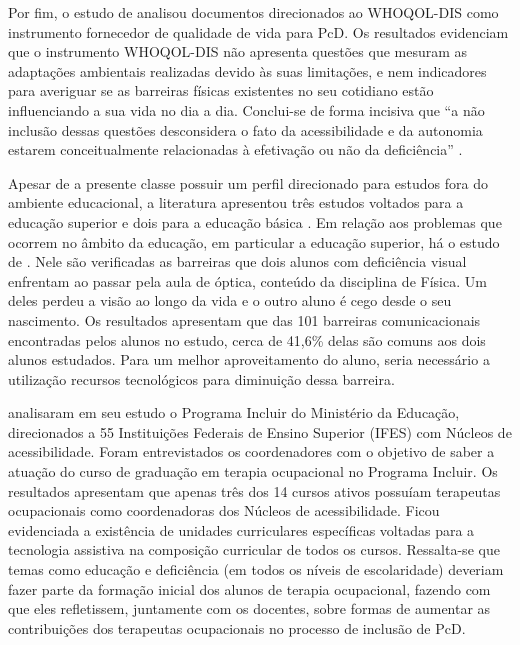 \documentclass{textolivre}
\begin{document}
Por fim, o estudo de \textcite{cantoranietal2015} analisou documentos direcionados ao WHOQOL-DIS como instrumento fornecedor de qualidade de vida para PcD. Os resultados evidenciam que o instrumento WHOQOL-DIS não apresenta questões que mesuram as adaptações ambientais realizadas devido às suas limitações, e nem indicadores para averiguar se as barreiras físicas existentes no seu cotidiano estão influenciando a sua vida no dia a dia. Conclui-se de forma incisiva que “a não inclusão dessas questões desconsidera o fato da acessibilidade e da autonomia estarem conceitualmente relacionadas à efetivação ou não da deficiência” \cite[p. 423]{cantoranietal2015}.

Apesar de a presente classe possuir um perfil direcionado para estudos fora do ambiente educacional, a literatura apresentou três estudos voltados para a educação superior \cite{camargo2008, gesser2017, nogueira2018} e dois para a educação básica \cite{kraemer2018, oliva2016}. Em relação aos problemas que ocorrem no âmbito da educação, em particular a educação superior, há o estudo de \textcite{camargo2008}. Nele são verificadas as barreiras que dois alunos com deficiência visual enfrentam ao passar pela aula de óptica, conteúdo da disciplina de Física. Um deles perdeu a visão ao longo da vida e o outro aluno é cego desde o seu nascimento. Os resultados apresentam que das 101 barreiras comunicacionais encontradas pelos alunos no estudo, cerca de 41,6\% delas são comuns aos dois alunos estudados. Para um melhor aproveitamento do aluno, seria necessário a utilização recursos tecnológicos para diminuição dessa barreira.

\textcite{nogueira2018} analisaram em seu estudo o Programa Incluir do Ministério da Educação, direcionados a 55 Instituições Federais de Ensino Superior (IFES) com Núcleos de acessibilidade. Foram entrevistados os coordenadores com o objetivo de saber a atuação do curso de graduação em terapia ocupacional no Programa Incluir. Os resultados apresentam que apenas três dos 14 cursos ativos possuíam terapeutas ocupacionais como coordenadoras dos Núcleos de acessibilidade. Ficou evidenciada a existência de unidades curriculares específicas voltadas para a tecnologia assistiva na composição curricular de todos os cursos. Ressalta-se que temas como educação e deficiência (em todos os níveis de escolaridade) deveriam fazer parte da formação inicial dos alunos de terapia ocupacional, fazendo com que eles refletissem, juntamente com os docentes, sobre formas de aumentar as contribuições dos terapeutas ocupacionais no processo de inclusão de PcD.
\end{document}
